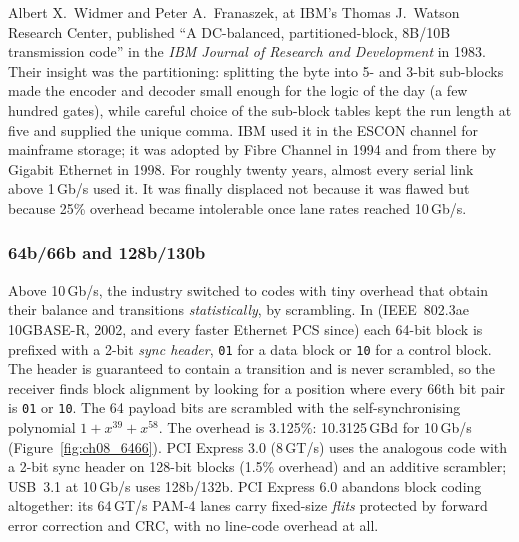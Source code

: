 \begin{history}
Albert X.~Widmer and Peter A.~Franaszek, at IBM's Thomas J.~Watson Research Center, published
``A DC-balanced, partitioned-block, 8B/10B transmission code'' in the \emph{IBM Journal of
Research and Development} in 1983. Their insight was the partitioning: splitting the byte
into 5- and 3-bit sub-blocks made the encoder and decoder small enough for the logic of the
day (a few hundred gates), while careful choice of the sub-block tables kept the run length
at five and supplied the unique comma. IBM used it in the ESCON channel for mainframe
storage; it was adopted by Fibre Channel in 1994 and from there by Gigabit Ethernet in 1998.
For roughly twenty years, almost every serial link above 1\,Gb/s used it. It was finally
displaced not because it was flawed but because 25\% overhead became intolerable once lane
rates reached 10\,Gb/s.
\end{history}

\subsubsection{64b/66b and 128b/130b}
Above 10\,Gb/s, the industry switched to codes with tiny overhead that obtain their balance and
transitions \emph{statistically}, by scrambling. In  (IEEE~802.3ae 10GBASE-R,
2002, and every faster Ethernet PCS since) each 64-bit block is prefixed with a 2-bit
\emph{sync header}, \texttt{01} for a data block or \texttt{10} for a control block. The header
is guaranteed to contain a transition and is never scrambled, so the receiver finds block
alignment by looking for a position where every 66th bit pair is \texttt{01} or \texttt{10}.
The 64 payload bits are scrambled with the self-synchronising polynomial $1+x^{39}+x^{58}$. The
overhead is 3.125\%: 10.3125\,GBd for 10\,Gb/s (Figure~\ref{fig:ch08_6466}). PCI Express 3.0 (8\,GT/s) uses the analogous
 code with a 2-bit sync header on 128-bit blocks (1.5\% overhead) and an
additive scrambler; USB~3.1 at 10\,Gb/s uses 128b/132b. PCI Express 6.0 abandons block
coding altogether: its 64\,GT/s PAM-4 lanes carry fixed-size \emph{flits} protected by forward
error correction and CRC, with no line-code overhead at all.

